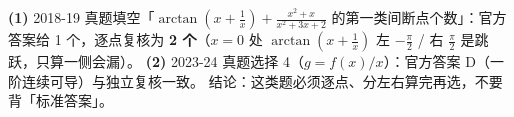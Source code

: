 \documentclass[11pt,a4paper]{ctexart}
\begin{document}
\begin{notebox}[关于答案的两处已知修正]
\textbf{(1)} 2018-19 真题填空「$\arctan(x+\frac1x)+\frac{x^2+x}{x^2+3x+2}$ 的第一类间断点个数」：官方答案给 1 个，逐点复核为 \textbf{2 个}（$x=0$ 处 $\arctan(x+\frac1x)$ 左 $-\frac\pi2$ / 右 $\frac\pi2$ 是跳跃，只算一侧会漏）。
\textbf{(2)} 2023-24 真题选择 4（$g=f(x)/x$）：官方答案 D（一阶连续可导）与独立复核一致。
结论：这类题必须逐点、分左右算完再选，不要背「标准答案」。
\end{notebox}


\end{document}
